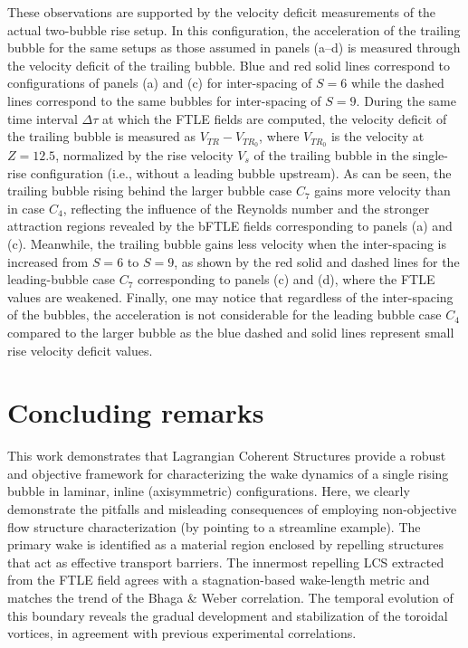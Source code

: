 \documentclass[aps,prfluids,reprint,nofootinbib,onecolumn,groupedaddress,showkeys]{revtex4-2}
\begin{document}
	These observations are supported by the velocity deficit measurements of the actual two-bubble rise setup. In this configuration, the acceleration of the trailing bubble for the same setups as those assumed in panels (a–d) is measured through the velocity deficit of the trailing bubble. Blue and red solid lines correspond to configurations of panels (a) and (c) for inter-spacing of $S=6$ while the dashed lines correspond to the same bubbles for inter-spacing of $S=9$. During the same time interval $\Delta\tau$ at which the FTLE fields are computed, the velocity deficit of the trailing bubble is measured as $V_{TR} - V_{TR_0}$, where $V_{TR_0}$ is the velocity at $Z = 12.5$, normalized by the rise velocity $V_s$ of the trailing bubble in the single-rise configuration (i.e., without a leading bubble upstream). As can be seen, the trailing bubble rising behind the larger bubble case $C_7$ gains more velocity than in case $C_4$, reflecting the influence of the Reynolds number and the stronger attraction regions revealed by the bFTLE fields corresponding to panels (a) and (c). Meanwhile, the trailing bubble gains less velocity when the inter-spacing is increased from $S = 6$ to $S = 9$, as shown by the red solid and dashed lines for the leading-bubble case $C_7$ corresponding to panels (c) and (d), where the FTLE values are weakened. Finally, one may notice that regardless of the inter-spacing of the bubbles, the acceleration is not considerable for the leading bubble case $C_4$ compared to the larger bubble as the blue dashed and solid lines represent small rise velocity deficit values. 
	
	\section{Concluding remarks}
	\label{Concluding remarks}
	
	This work demonstrates that Lagrangian Coherent Structures provide a robust and objective framework for characterizing the wake dynamics of a single rising bubble {\color{black}in laminar, inline (axisymmetric) configurations}. Here, we clearly demonstrate the pitfalls and misleading consequences of employing non-objective flow structure characterization (by pointing to a streamline example). The primary wake is identified as a material region enclosed by repelling structures that act as effective transport barriers. The innermost repelling LCS extracted from the FTLE field {\color{black}agrees} with a stagnation-based wake-length metric and matches the trend of the {\color{black}Bhaga \& Weber} correlation. The temporal evolution of this boundary reveals the gradual development and stabilization of the toroidal vortices, in agreement with previous experimental correlations.
	
\end{document}
